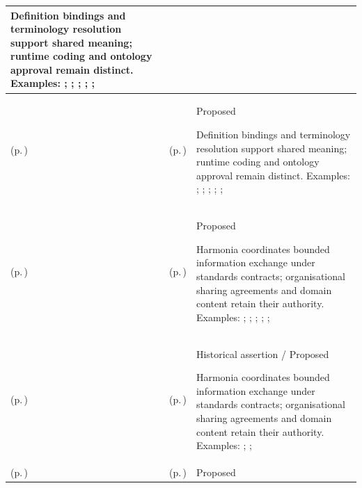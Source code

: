 \begin{longtable}{|>{\raggedright\arraybackslash}p{0.27\TableWidth}|>{\raggedright\arraybackslash}p{0.27\TableWidth}|>{\raggedright\arraybackslash}p{0.46\TableWidth}|}
Definition bindings and terminology resolution support shared meaning; runtime coding and ontology approval remain distinct. Examples: \nameref{feature:feat-ise-27}; \nameref{feature:feat-ise-28}; \nameref{function:govern-information-semantics}; \nameref{service:semantic-model-definition-service}; \nameref{function:govern-information-definition}; \nameref{service:information-dictionary-query}\\\hline
\nameref{cap:bc-clinical-semantics-governance} (p.\,\pageref{cap:bc-clinical-semantics-governance}) & \nameref{cap:bec-clinical-knowledge-services} (p.\,\pageref{cap:bec-clinical-knowledge-services}) & Proposed

Definition bindings and terminology resolution support shared meaning; runtime coding and ontology approval remain distinct. Examples: \nameref{feature:feat-ise-14}; \nameref{feature:feat-ise-15}; \nameref{function:resolve-clinical-concept}; \nameref{service:terminology-concept-resolution-service}; \nameref{function:map-clinical-concept}; \nameref{service:terminology-mapping-service}\\\hline
\nameref{cap:bc-health-information-exchange} (p.\,\pageref{cap:bc-health-information-exchange}) & \nameref{cap:bec-health-information-exchange} (p.\,\pageref{cap:bec-health-information-exchange}) & Proposed

Harmonia coordinates bounded information exchange under standards contracts; organisational sharing agreements and domain content retain their authority. Examples: \nameref{feature:feat-ise-04}; \nameref{feature:feat-ise-05}; \nameref{feature:feat-ise-06}; \nameref{feature:feat-ise-07}; \nameref{function:receive-information-submission}; \nameref{service:hie-submission-gateway-service}\\\hline
\nameref{cap:bc-health-information-exchange} (p.\,\pageref{cap:bc-health-information-exchange}) & \nameref{cap:bec-health-information-communication} (p.\,\pageref{cap:bec-health-information-communication}) & Historical assertion / Proposed

Harmonia coordinates bounded information exchange under standards contracts; organisational sharing agreements and domain content retain their authority. Examples: \nameref{feature:feat-ise-10}; \nameref{function:mediate-standards-based-health-information-communication}; \nameref{service:standards-communication-gateway-service}\\\hline
\nameref{cap:bc-digital-communication-channel} (p.\,\pageref{cap:bc-digital-communication-channel}) & \nameref{cap:bec-clinical-communication-administration} (p.\,\pageref{cap:bec-clinical-communication-administration}) & Proposed


\end{longtable}

